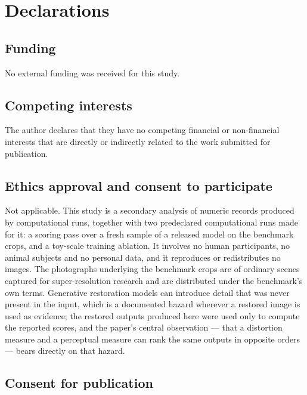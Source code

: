 \section*{Declarations}

\subsection*{Funding}

No external funding was received for this study.

\subsection*{Competing interests}

The author declares that they have no competing financial or non-financial
interests that are directly or indirectly related to the work submitted for
publication.

\subsection*{Ethics approval and consent to participate}

Not applicable. This study is a secondary analysis of numeric records produced
by computational runs, together with two predeclared computational runs made
for it: a scoring pass over a fresh sample of a released model on the benchmark
crops, and a toy-scale training ablation. It involves no human participants, no
animal subjects and no personal data, and it reproduces or redistributes no
images. The photographs underlying the benchmark crops are of ordinary scenes
captured for super-resolution research and are distributed under the
benchmark's own terms. Generative restoration models can introduce detail that
was never present in the input, which is a documented hazard wherever a
restored image is used as evidence; the restored outputs produced here were
used only to compute the reported scores, and the paper's central observation
--- that a distortion measure and a perceptual measure can rank the same
outputs in opposite orders --- bears directly on that hazard.

\subsection*{Consent for publication}

